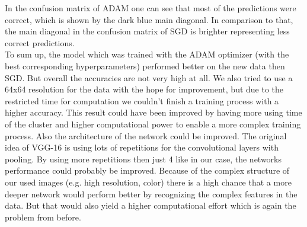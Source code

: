 \documentclass{tubaf-article}
\begin{document}
	In the confusion matrix of ADAM one can see that most of the predictions were correct, which is shown by the dark blue main diagonal. In comparison to that, the main diagonal in the confusion matrix of SGD is brighter representing less correct predictions. \\
	To sum up, the model which was trained with the ADAM optimizer (with the best corresponding hyperparameters) performed better on the new data then SGD. But overall the accuracies are not very high at all. We also tried to use a 64x64 resolution for the data with the hope for improvement, but due to the restricted time for computation we couldn't finish a training process with a higher accuracy. This result could have been improved by having more using time of the cluster and higher computational power to enable a more complex training process. Also the architecture of the network could be improved. The original idea of VGG-16 is using lots of repetitions for the convolutional layers with pooling. By using more repetitions then just 4 like in our case, the networks performance could probably be improved. Because of the complex structure of our used images (e.g. high resolution, color) there is a high chance that a more deeper network would perform better by recognizing the complex features in the data. But that would also yield a higher computational effort which is again the problem from before. 
	
\end{document}
